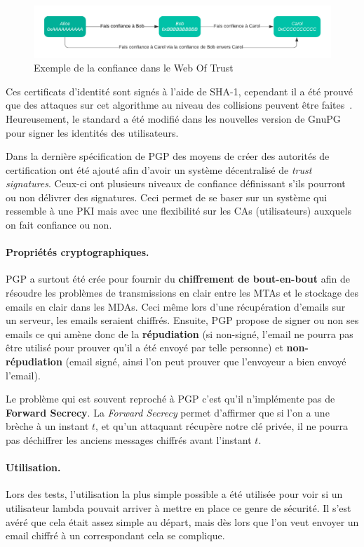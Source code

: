 \begin{figure}[h!]
	\includegraphics[width=\textwidth]{images/WOTExample.pdf}
	\centering
	\caption{Exemple de la confiance dans le Web Of Trust}
	\label{fig:WOTExample}
\end{figure}

Ces certificats d'identité sont signés à l'aide de SHA-1, cependant il a été prouvé que des attaques sur cet algorithme au niveau des collisions peuvent être faites~\cite{journals/iacr/LeurentP20}. Heureusement, le standard a été modifié dans les nouvelles version de GnuPG pour signer les identités des utilisateurs.

Dans la dernière spécification de PGP des moyens de créer des autorités de certification ont été ajouté afin d'avoir un système décentralisé de \textit{trust signatures}. Ceux-ci ont plusieurs niveaux de confiance définissant s'ils pourront ou non délivrer des signatures. Ceci permet de se baser sur un système qui ressemble à une PKI mais avec une flexibilité sur les CAs (utilisateurs) auxquels on fait confiance ou non.
\paragraph*{Propriétés cryptographiques.}
PGP a surtout été crée pour fournir du \textbf{chiffrement de bout-en-bout} afin de résoudre les problèmes de transmissions en clair entre les MTAs et le stockage des emails en clair dans les MDAs. Ceci même lors d'une récupération d'emails sur un serveur, les emails seraient chiffrés. Ensuite, PGP propose de signer ou non ses emails ce qui amène donc de la \textbf{répudiation} (si non-signé, l'email ne pourra pas être utilisé pour prouver qu'il a été envoyé par telle personne) et \textbf{non-répudiation} (email signé, ainsi l'on peut prouver que l'envoyeur a bien envoyé l'email).

Le problème qui est souvent reproché à PGP c'est qu'il n'implémente pas de \textbf{Forward Secrecy}. La \textit{Forward Secrecy} permet d'affirmer que si l'on a une brèche à un instant $t$, et qu'un attaquant récupère notre clé privée, il ne pourra pas déchiffrer les anciens messages chiffrés avant l'instant $t$.
\paragraph*{Utilisation.}
Lors des tests, l’utilisation la plus simple possible a été utilisée pour voir si un utilisateur lambda pouvait arriver à mettre en place ce genre de sécurité. Il s’est avéré que cela était assez simple au départ, mais dès lors que l'on veut envoyer un email chiffré à un correspondant cela se complique.


